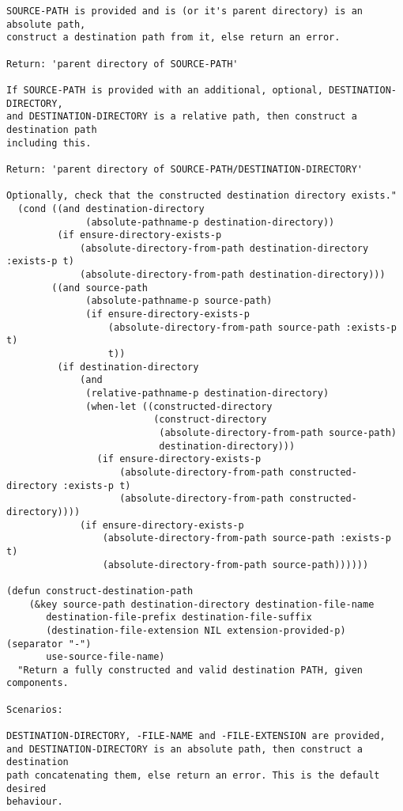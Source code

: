 \documentclass{article}
\begin{document}
\begin{verbatim}
SOURCE-PATH is provided and is (or it's parent directory) is an absolute path,
construct a destination path from it, else return an error.

Return: 'parent directory of SOURCE-PATH'

If SOURCE-PATH is provided with an additional, optional, DESTINATION-DIRECTORY,
and DESTINATION-DIRECTORY is a relative path, then construct a destination path
including this.

Return: 'parent directory of SOURCE-PATH/DESTINATION-DIRECTORY'

Optionally, check that the constructed destination directory exists."
  (cond ((and destination-directory
              (absolute-pathname-p destination-directory))
         (if ensure-directory-exists-p
             (absolute-directory-from-path destination-directory :exists-p t)
             (absolute-directory-from-path destination-directory)))
        ((and source-path
              (absolute-pathname-p source-path)
              (if ensure-directory-exists-p
                  (absolute-directory-from-path source-path :exists-p t)
                  t))
         (if destination-directory
             (and
              (relative-pathname-p destination-directory)
              (when-let ((constructed-directory
                          (construct-directory
                           (absolute-directory-from-path source-path)
                           destination-directory)))
                (if ensure-directory-exists-p
                    (absolute-directory-from-path constructed-directory :exists-p t)
                    (absolute-directory-from-path constructed-directory))))
             (if ensure-directory-exists-p
                 (absolute-directory-from-path source-path :exists-p t)
                 (absolute-directory-from-path source-path))))))

(defun construct-destination-path
    (&key source-path destination-directory destination-file-name
       destination-file-prefix destination-file-suffix
       (destination-file-extension NIL extension-provided-p) (separator "-")
       use-source-file-name)
  "Return a fully constructed and valid destination PATH, given
components.

Scenarios:

DESTINATION-DIRECTORY, -FILE-NAME and -FILE-EXTENSION are provided,
and DESTINATION-DIRECTORY is an absolute path, then construct a destination
path concatenating them, else return an error. This is the default desired
behaviour.


\end{verbatim}
\end{document}

